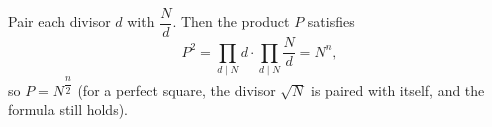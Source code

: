 Pair each divisor $d$ with $\dfrac {N}{d}$. Then the product $P$ satisfies
\[P^2=\prod_{d\mid N}d\cdot\prod_{d\mid N}\dfrac {N}{d}=N^n,\]
so $P=\boxed{N^{\dfrac {n}{2}}}$ (for a perfect square, the divisor $\sqrt N$ is paired with itself, and the formula still holds).
